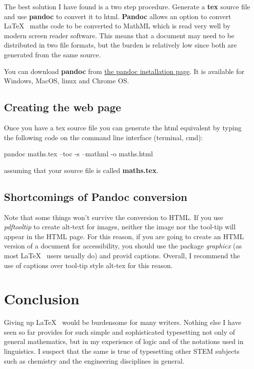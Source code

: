 \documentclass[]{article}
\begin{document}
The best solution I have found is a two step procedure. Generate a
\textbf{tex} source file and use \textbf{pandoc} to convert it to html.
\textbf{Pandoc} allows an option to convert \LaTeX~ maths code to be
converted to MathML which is read very well by modern screen reader
software. This means that a document may need to be distributed in two
file formats, but the burden is relatively low since both are generated
from the same source.

You can download \textbf{pandoc} from
\href{https://pandoc.org/installing.html}{the pandoc installation page}.
It is available for Windows, MacOS, linux and Chrome OS.

\hypertarget{creating-the-web-page}{%
\subsection{Creating the web page}\label{creating-the-web-page}}

Once you have a tex source file you can generate the html equivalent by
typing the following code on the command line interface (terminal, cmd):

pandoc maths.tex --toc -s --mathml -o maths.html

assuming that your source file is called \textbf{maths.tex}.

\subsection{Shortcomings of Pandoc conversion}

Note that some things won't survive the conversion to HTML.  If you use
\emph{pdftooltip} to create alt-text for images, neither the image nor the tool-tip will appear in the 
HTML page.  For this reason, if you are going to create an HTML version of a document for accessibility, you 
should use the package \emph{graphicx} (as most \LaTeX~ users usually do) and provid captions.  Overall, 
I recommend the use of captions over tool-tip style alt-tex for this reason.

\hypertarget{conclusion}{%
\section{Conclusion}\label{conclusion}}

Giving up \LaTeX~ would be burdensome for many writers. Nothing else I
have seen so far provides for such simple and sophisticated typesetting not
only of general mathematics, but in my experience of logic and of the
notations used in linguistics. I suspect that the same is true of
typesetting other STEM subjects such as chemistry and the engineering
disciplines in general.
\end{document}
